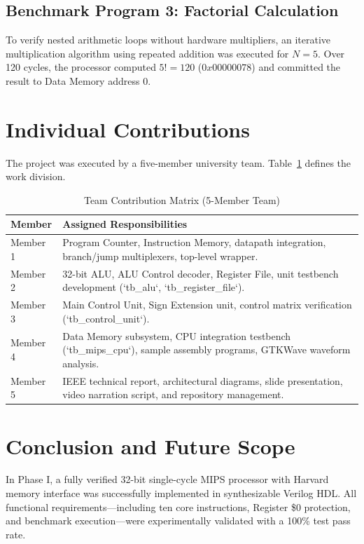\documentclass[conference]{IEEEtran}
\begin{document}
\subsection{Benchmark Program 3: Factorial Calculation}
To verify nested arithmetic loops without hardware multipliers, an iterative multiplication algorithm using repeated addition was executed for $N=5$. Over 120 cycles, the processor computed $5! = 120$ ($0x00000078$) and committed the result to Data Memory address 0.

\section{Individual Contributions}
The project was executed by a five-member university team. Table~\ref{tab_contributions} defines the work division.

\begin{table}[htbp]
\caption{Team Contribution Matrix (5-Member Team)}
\label{tab_contributions}
\centering
\begin{tabular}{lp{5.5cm}}
\toprule
\textbf{Member} & \textbf{Assigned Responsibilities} \\
\midrule
Member 1 & Program Counter, Instruction Memory, datapath integration, branch/jump multiplexers, top-level wrapper. \\
Member 2 & 32-bit ALU, ALU Control decoder, Register File, unit testbench development (`tb_alu`, `tb_register_file`). \\
Member 3 & Main Control Unit, Sign Extension unit, control matrix verification (`tb_control_unit`). \\
Member 4 & Data Memory subsystem, CPU integration testbench (`tb_mips_cpu`), sample assembly programs, GTKWave waveform analysis. \\
Member 5 & IEEE technical report, architectural diagrams, slide presentation, video narration script, and repository management. \\
\bottomrule
\end{tabular}
\end{table}

\section{Conclusion and Future Scope}
In Phase I, a fully verified 32-bit single-cycle MIPS processor with Harvard memory interface was successfully implemented in synthesizable Verilog HDL. All functional requirements—including ten core instructions, Register \$0 protection, and benchmark execution—were experimentally validated with a 100\% test pass rate.
\end{document}
